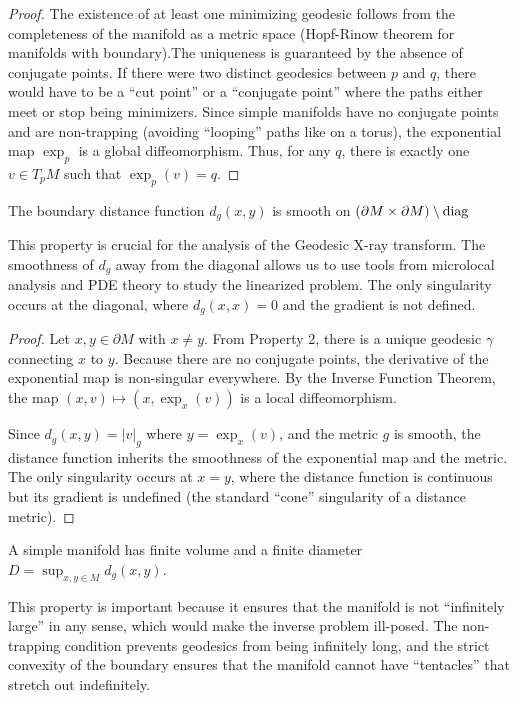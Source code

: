 \begin{proof}
  The existence of at least one minimizing geodesic follows from the completeness of the manifold as a metric space (Hopf-Rinow theorem for manifolds with boundary).The uniqueness is guaranteed by the absence of conjugate points. If there were two distinct geodesics between $p$ and $q$, there would have to be a ``cut point'' or a ``conjugate point'' where the paths either meet or stop being minimizers. Since simple manifolds have no conjugate points and are non-trapping (avoiding ``looping'' paths like on a torus), the exponential map $\exp_p$ is a global diffeomorphism. Thus, for any $q$, there is exactly one $v \in T_pM$ such that $\exp_p(v) = q$.
\end{proof}

\begin{property}
  The boundary distance function $d_g(x, y)$ is smooth on $(\partial M \times \partial M) \setminus \operatorname{diag}$
\end{property}

This property is crucial for the analysis of the Geodesic X-ray transform. The smoothness of $d_g$ away from the diagonal allows us to use tools from microlocal analysis and PDE theory to study the linearized problem. The only singularity occurs at the diagonal, where $d_g(x, x) = 0$ and the gradient is not defined.

\begin{proof}
  Let $x, y \in \partial M$ with $x \neq y$. From Property 2, there is a unique geodesic $\gamma$ connecting $x$ to $y$. Because there are no conjugate points, the derivative of the exponential map is non-singular everywhere. By the Inverse Function Theorem, the map $(x, v) \mapsto (x, \exp_x(v))$ is a local diffeomorphism.

  Since $d_g(x, y) = |v|_g$ where $y = \exp_x(v)$, and the metric $g$ is smooth, the distance function inherits the smoothness of the exponential map and the metric. The only singularity occurs at $x = y$, where the distance function is continuous but its gradient is undefined (the standard ``cone'' singularity of a distance metric).
\end{proof}

\begin{property}
  A simple manifold has finite volume and a finite diameter $D = \sup_{x,y \in M} d_g(x, y)$.
\end{property}

This property is important because it ensures that the manifold is not ``infinitely large'' in any sense, which would make the inverse problem ill-posed. The non-trapping condition prevents geodesics from being infinitely long, and the strict convexity of the boundary ensures that the manifold cannot have ``tentacles'' that stretch out indefinitely.

